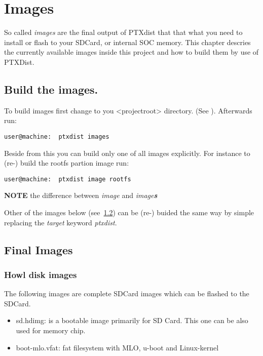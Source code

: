 \chapter{Images}%
So called \textit{images} are the final output of PTXdist that that what you
need to install or flash to your SDCard, or internal SOC memory. This chapter
descries the currently available images inside this project and how to build
them by use of PTXDist.


\section{Build the images.}%
\label{sec:final_images_generation}
To build images first change to you <projectroot> directory.
(See ). Afterwards run:

\bigbreak%
\begin{lstlisting}[caption=Building of all Images]
user@machine:  ptxdist images
\end{lstlisting}

Beside from this you can build only one of all images explicitly. For
instance to (re-) build the rootfs partion image run:

\bigbreak%
\begin{lstlisting}[caption=Example: Build the RootFS automatically]
user@machine:  ptxdist image rootfs
\end{lstlisting}

\textbf{NOTE} the difference between \textit{image} and \textit{image\textbf{s}}
\bigbreak%

Other of the images below (see~\ref{sec:final_images}) can be (re-) buided the
same way by simple replacing the \textit{target} keyword \textit{ptxdist}.

\section{Final Images}%
\label{sec:final_images}

\subsection{Howl disk images}
\label{sub:howl_disk}

The following images are complete SDCard images which can be flashed to the
SDCard.


\begin{itemize}
    \item sd.hdimg: is a bootable image primarily for SD Card.
        This one can be also used for memory chip.
    \item boot-mlo.vfat: fat filesystem with MLO, u-boot and Linux-kernel
\end{itemize}

